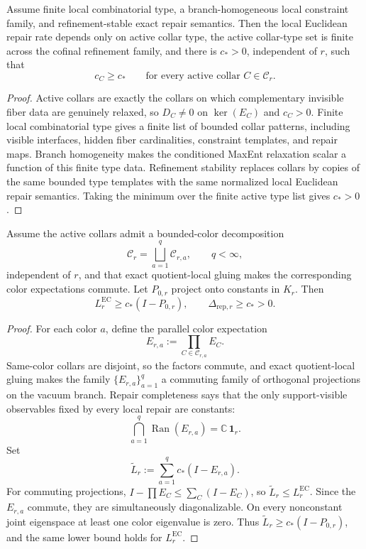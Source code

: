 \begin{lemma}
\label{lem:repair-rate-floor}
Assume finite local combinatorial type, a branch-homogeneous local constraint family, and
refinement-stable exact repair semantics. Then the local Euclidean repair rate depends only on
active collar type, the active collar-type set is finite across the cofinal refinement family, and
there is \(c_*>0\), independent of \(r\), such that
\[
c_C\ge c_*
\qquad\text{for every active collar }C\in\mathcal C_r.
\]
\end{lemma}

\begin{proof}
Active collars are exactly the collars on which complementary invisible fiber data are genuinely
relaxed, so \(D_C\neq0\) on \(\ker(E_C)\) and \(c_C>0\). Finite local combinatorial type gives a
finite list of bounded collar patterns, including visible interfaces, hidden fiber cardinalities,
constraint templates, and repair maps. Branch homogeneity makes the conditioned MaxEnt relaxation
scalar a function of this finite type data. Refinement stability replaces collars by copies of the
same bounded type templates with the same normalized local Euclidean repair semantics. Taking the
minimum over the finite active type list gives \(c_*>0\).
\end{proof}

\begin{proposition}
\label{prop:finite-stage-repair-gap}
Assume the active collars admit a bounded-color decomposition
\[
\mathcal C_r=\bigsqcup_{a=1}^{q}\mathcal C_{r,a},
\qquad q<\infty,
\]
independent of \(r\), and that exact quotient-local gluing makes the corresponding color
expectations commute. Let \(P_{0,r}\) project onto constants in \(K_r\). Then
\[
L_r^{\mathrm{EC}}\ge c_*(I-P_{0,r}),
\qquad
\Delta_{\mathrm{rep},r}\ge c_*>0.
\]
\end{proposition}

\begin{proof}
For each color \(a\), define the parallel color expectation
\[
E_{r,a}:=\prod_{C\in\mathcal C_{r,a}}E_C.
\]
Same-color collars are disjoint, so the factors commute, and exact quotient-local gluing makes
the family \(\{E_{r,a}\}_{a=1}^q\) a commuting family of orthogonal projections on the vacuum
branch. Repair completeness says that the only support-visible observables fixed by every local
repair are constants:
\[
\bigcap_{a=1}^{q}\operatorname{Ran}(E_{r,a})=\mathbb C\,\mathbf 1_r.
\]
Set
\[
\widetilde L_r:=\sum_{a=1}^{q} c_*(I-E_{r,a}).
\]
For commuting projections, \(I-\prod E_C\le\sum_C(I-E_C)\), so
\(\widetilde L_r\le L_r^{\mathrm{EC}}\). Since the \(E_{r,a}\) commute, they are simultaneously
diagonalizable. On every nonconstant joint eigenspace at least one color eigenvalue is zero.
Thus \(\widetilde L_r\ge c_*(I-P_{0,r})\), and the same lower bound holds for
\(L_r^{\mathrm{EC}}\).
\end{proof}

